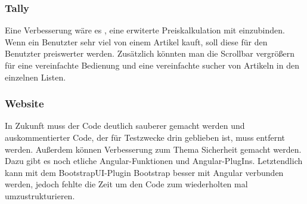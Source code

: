 \documentclass[11pt,a4paper]{article} %
\begin{document}
\subsubsection{Tally}
Eine Verbesserung wäre es , eine erwiterte Preiskalkulation mit einzubinden. Wenn ein Benutzter sehr viel von einem Artikel kauft, soll diese für den Benutzter preiswerter werden.
Zusätzlich könnten man die Scrollbar vergrößern für eine vereinfachte Bedienung und eine vereinfachte sucher von Artikeln in den einzelnen Listen.

\subsubsection{Website}
In Zukunft muss der Code deutlich sauberer gemacht werden und auskommentierter Code, der für Testzwecke drin geblieben ist, muss entfernt werden. Außerdem können Verbesserung zum Thema Sicherheit gemacht werden. Dazu gibt es noch etliche Angular-Funktionen und Angular-PlugIns. Letztendlich kann mit dem BootstrapUI-Plugin Bootstrap besser mit Angular verbunden werden, jedoch fehlte die Zeit um den Code zum wiederholten mal umzustrukturieren.

\newpage
\newpage
\begin{center}


\end{center}
\end{document}
